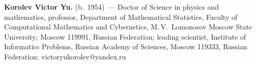 \vspace*{3pt}

\noindent
\textbf{Korolev Victor Yu.} (b.\ 1954)~--- Doctor of Science in 
physics and mathematics, professor, Department of Mathematical Statistics, 
Faculty of Computational Mathematics and Cybernetics, M.\,V.~Lomonosov
 Moscow State University; Moscow 119991, Russian Federation;
 leading scientist, Institute of Informatics Problems, Russian 
Academy of Sciences, Moscow 119333, Russian Federation; victoryukorolev@yandex.ru

 \label{end\stat}
\renewcommand{\bibname}{\protect\rm Литература}  